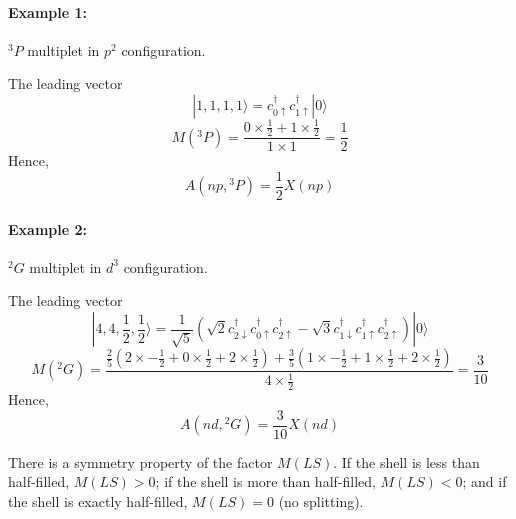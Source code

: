 \paragraph{Example 1:} $^3P$ multiplet in $p^2$ configuration.

The leading vector
\begin{equation*}
|1,1,1,1\rangle = c_{0\uparrow}^\dagger c_{1\uparrow}^\dagger |0\rangle
\end{equation*}
\begin{equation*}
M({^3P}) = \frac{0\times \frac{1}{2} + 1\times \frac{1}{2}}{1\times 1} = \frac{1}{2}
\end{equation*}
Hence,
\begin{equation*}
A(np, {^3P}) = \frac{1}{2} X(np)
\end{equation*}

\paragraph{Example 2:} $^2G$ multiplet in $d^3$ configuration.

The leading vector
\begin{equation*}
|4,4,\frac{1}{2},\frac{1}{2}\rangle = \frac{1}{\sqrt{5}} \left( \sqrt{2}c_{2\downarrow}^\dagger c_{0\uparrow}^\dagger c_{2\uparrow}^\dagger -\sqrt{3}c_{1\downarrow}^\dagger c_{1\uparrow}^\dagger c_{2\uparrow}^\dagger \right)|0\rangle
\end{equation*}
\begin{equation*}
M({^2G})
= \frac{\frac{2}{5}(2\times -\frac{1}{2} + 0\times \frac{1}{2} + 2\times \frac{1}{2}) +
\frac{3}{5}(1\times -\frac{1}{2} + 1\times \frac{1}{2} + 2\times \frac{1}{2})
}{4\times \frac{1}{2}} = \frac{3}{10}
\end{equation*}
Hence,
\begin{equation*}
A(nd, {^2G}) = \frac{3}{10} X(nd)
\end{equation*}

There is a symmetry property of the factor $M(LS)$. If the shell is less than half-filled,
$M(LS)>0$; if the shell is more than half-filled, $M(LS)<0$; and if the shell is
exactly half-filled, $M(LS)=0$ (no splitting).

